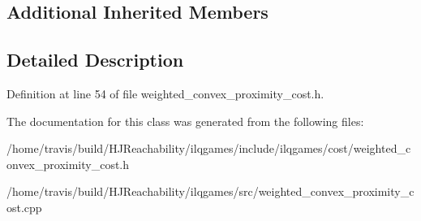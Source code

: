 \subsection*{Additional Inherited Members}


\subsection{Detailed Description}


Definition at line 54 of file weighted\+\_\+convex\+\_\+proximity\+\_\+cost.\+h.



The documentation for this class was generated from the following files\+:\begin{DoxyCompactItemize}
\item 
/home/travis/build/\+H\+J\+Reachability/ilqgames/include/ilqgames/cost/weighted\+\_\+convex\+\_\+proximity\+\_\+cost.\+h\item 
/home/travis/build/\+H\+J\+Reachability/ilqgames/src/weighted\+\_\+convex\+\_\+proximity\+\_\+cost.\+cpp\end{DoxyCompactItemize}
